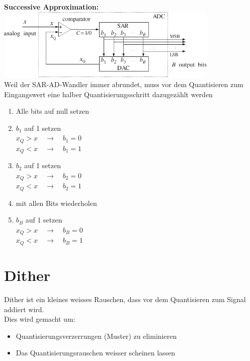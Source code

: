 	\begin{minipage}[t]{0.66\textwidth}
		\textbf{Successive Approximation:}\\[0.2cm]
		\includegraphics[width = 0.8\textwidth]{pic/sar.pdf}\\[0.2cm]
		Weil der SAR-AD-Wandler immer abrundet, muss vor dem Quantisieren zum Eingangswert eine halber Quantisierungsschritt dazugezählt werden\\[0.2cm]
	\end{minipage}
	\begin{minipage}[t]{0.3\textwidth}
		\begin{enumerate}
		\item Alle bits auf null setzen
		\item $b_1$ auf 1 setzen\\
			$x_Q>x\quad\rightarrow\quad b_1 = 0$\\
			$x_Q<x\quad\rightarrow\quad b_1 = 1$
		\item $b_2$ auf 1 setzen\\
			$x_Q>x\quad\rightarrow\quad b_2 = 0$\\
			$x_Q<x\quad\rightarrow\quad b_2 = 1$
		\item mit allen Bits wiederholen
		\item $b_B$ auf 1 setzen\\
			$x_Q>x\quad\rightarrow\quad b_B = 0$\\
			$x_Q<x\quad\rightarrow\quad b_B = 1$
		\end{enumerate}	
	\end{minipage}

\section{Dither}
	Dither ist ein kleines weisses Rauschen, dass vor dem Quantisieren zum Signal addiert wird.\\ Dies wird gemacht um:
	\begin{itemize}
	 \item Quantisierungsverzerrungen (Muster) zu eliminieren 
	 \item Das Quantisierungsrauschen weisser scheinen lassen
	\end{itemize}

